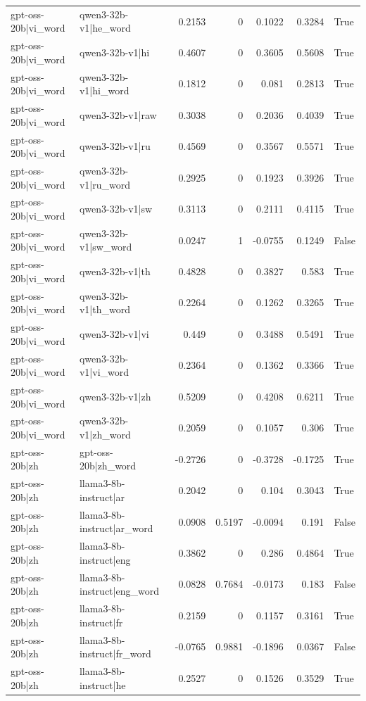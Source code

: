 \begin{table}
\begin{tabular}{l l r r r r l}
gpt-oss-20b|vi_word & qwen3-32b-v1|he_word & 0.2153 & 0 & 0.1022 & 0.3284 & True \\
gpt-oss-20b|vi_word & qwen3-32b-v1|hi & 0.4607 & 0 & 0.3605 & 0.5608 & True \\
gpt-oss-20b|vi_word & qwen3-32b-v1|hi_word & 0.1812 & 0 & 0.081 & 0.2813 & True \\
gpt-oss-20b|vi_word & qwen3-32b-v1|raw & 0.3038 & 0 & 0.2036 & 0.4039 & True \\
gpt-oss-20b|vi_word & qwen3-32b-v1|ru & 0.4569 & 0 & 0.3567 & 0.5571 & True \\
gpt-oss-20b|vi_word & qwen3-32b-v1|ru_word & 0.2925 & 0 & 0.1923 & 0.3926 & True \\
gpt-oss-20b|vi_word & qwen3-32b-v1|sw & 0.3113 & 0 & 0.2111 & 0.4115 & True \\
gpt-oss-20b|vi_word & qwen3-32b-v1|sw_word & 0.0247 & 1 & -0.0755 & 0.1249 & False \\
gpt-oss-20b|vi_word & qwen3-32b-v1|th & 0.4828 & 0 & 0.3827 & 0.583 & True \\
gpt-oss-20b|vi_word & qwen3-32b-v1|th_word & 0.2264 & 0 & 0.1262 & 0.3265 & True \\
gpt-oss-20b|vi_word & qwen3-32b-v1|vi & 0.449 & 0 & 0.3488 & 0.5491 & True \\
gpt-oss-20b|vi_word & qwen3-32b-v1|vi_word & 0.2364 & 0 & 0.1362 & 0.3366 & True \\
gpt-oss-20b|vi_word & qwen3-32b-v1|zh & 0.5209 & 0 & 0.4208 & 0.6211 & True \\
gpt-oss-20b|vi_word & qwen3-32b-v1|zh_word & 0.2059 & 0 & 0.1057 & 0.306 & True \\
gpt-oss-20b|zh & gpt-oss-20b|zh_word & -0.2726 & 0 & -0.3728 & -0.1725 & True \\
gpt-oss-20b|zh & llama3-8b-instruct|ar & 0.2042 & 0 & 0.104 & 0.3043 & True \\
gpt-oss-20b|zh & llama3-8b-instruct|ar_word & 0.0908 & 0.5197 & -0.0094 & 0.191 & False \\
gpt-oss-20b|zh & llama3-8b-instruct|eng & 0.3862 & 0 & 0.286 & 0.4864 & True \\
gpt-oss-20b|zh & llama3-8b-instruct|eng_word & 0.0828 & 0.7684 & -0.0173 & 0.183 & False \\
gpt-oss-20b|zh & llama3-8b-instruct|fr & 0.2159 & 0 & 0.1157 & 0.3161 & True \\
gpt-oss-20b|zh & llama3-8b-instruct|fr_word & -0.0765 & 0.9881 & -0.1896 & 0.0367 & False \\
gpt-oss-20b|zh & llama3-8b-instruct|he & 0.2527 & 0 & 0.1526 & 0.3529 & True \\

\end{tabular}
\end{table}
